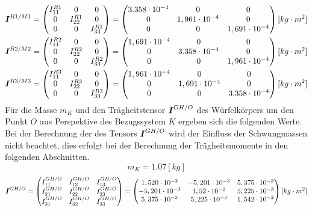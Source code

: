 \begin{equation}
\begin{split}
\boldsymbol{I}^{R1/M1} &= \begin{pmatrix}
I^{R1}_{11} & 0 & 0 \\ 0 & I^{R1}_{22} & 0 \\ 0 & 0 & I^{R1}_{33}
\end{pmatrix} = 
\begin{pmatrix}
3.358\cdot 10^{-4} & 0 & 0 \\
0 & 1,961\cdot 10^{-4} & 0 \\
0 & 0 & 1,691\cdot 10^{-4}
\end{pmatrix}[kg\cdot m^2]
\\
\boldsymbol{I}^{R2/M2} &= \begin{pmatrix}
I^{R2}_{11} & 0 & 0 \\ 0 & I^{R2}_{22} & 0 \\ 0 & 0 & I^{R2}_{33}
\end{pmatrix} = 
\begin{pmatrix}
1,691\cdot 10^{-4} & 0 & 0 \\
0 & 3.358\cdot 10^{-4} & 0 \\
0 & 0 & 1,961\cdot 10^{-4}
\end{pmatrix}[kg\cdot m^2]
\\
\boldsymbol{I}^{R3/M3} &= \begin{pmatrix}
I^{R3}_{11} & 0 & 0 \\ 0 & I^{R3}_{22} & 0 \\ 0 & 0 & I^{R3}_{33}
\end{pmatrix} = 
\begin{pmatrix}
1,961\cdot 10^{-4} & 0 & 0 \\
0 & 1,691\cdot 10^{-4} & 0 \\
0 & 0 & 3.358\cdot 10^{-4}
\end{pmatrix}[kg\cdot m^2]
\end{split}
\end{equation}
Für die Masse $m_K$ und den Trägheitstensor $\boldsymbol{I}^{GH/O}$ des Würfelkörpers um den Punkt $O$ aus Perspektive des Bezugssystem $K$ ergeben sich die folgenden Werte. Bei der Berechnung der des Tensors $\boldsymbol{I}^{GH/O}$ wird der Einfluss der Schwungmassen nicht beachtet, dies erfolgt bei der Berechnung der Trägheitsmomente in den folgenden Abschnitten.
\begin{equation}
m_K = 1.07[kg]
\end{equation}
\begin{equation}
\boldsymbol{I}^{GH/O} = \begin{pmatrix}
I^{GH/O}_{11} & I^{GH/O}_{12} & I^{GH/O}_{13} \\
I^{GH/O}_{21} & I^{GH/O}_{22} & I^{GH/O}_{23} \\
I^{GH/O}_{31} & I^{GH/O}_{32} & I^{GH/O}_{33}
\end{pmatrix} =
\begin{pmatrix}
1,520\cdot 10^{-2} & -5,201\cdot 10^{-3} & 5,375\cdot 10^{-3} \\
-5,201\cdot 10^{-3} & 1,52\cdot 10^{-2} & 5,225\cdot 10^{-3} \\
5,375\cdot 10^{-3} & 5,225\cdot 10^{-3} & 1,542\cdot 10^{-2}
\end{pmatrix}[kg\cdot m^2]
\end{equation}
